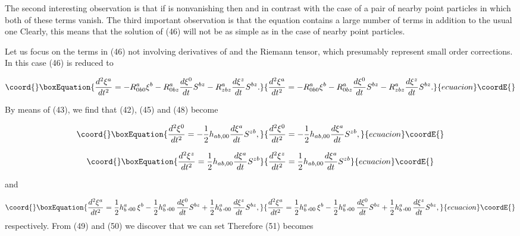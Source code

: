 \documentclass[a4paper,12pt]{article}
\begin{document}
The second interesting observation is that if \coordHE{} is nonvanishing then \coordHE{} and \coordHE{}
in contrast with the case of a pair of nearby point particles in which both
of these terms vanish. The third important observation is that the \coordHE{} equation contains a large number of terms in
addition to the usual one \coordHE{} Clearly, this means that
the solution of (46) will not be as simple as in the case of nearby point
particles.

Let us focus on the terms in (46) not involving derivatives of \coordHE{} and
the Riemann tensor, which presumably represent small order corrections. In
this case (46) is reduced to

\begin{equation}\coord{}\boxEquation{
\frac{d^{2}\xi ^{a}}{dt^{2}}=-R_{0b0}^{a}\xi ^{b}-R_{0bz}^{a}\frac{d\xi ^{0}
}{dt}S^{bz}-R_{zbz}^{a}\frac{d\xi ^{z}}{dt}S^{bz}.  \label{48}
}{
\frac{d^{2}\xi ^{a}}{dt^{2}}=-R_{0b0}^{a}\xi ^{b}-R_{0bz}^{a}\frac{d\xi ^{0}
}{dt}S^{bz}-R_{zbz}^{a}\frac{d\xi ^{z}}{dt}S^{bz}.  }{ecuacion}\coordE{}\end{equation}

By means of (43), we find that (42), (45) and (48) become

\begin{equation}\coord{}\boxEquation{
\frac{d^{2}\xi^{0}}{dt^{2}}=-\frac{1}{2}h_{ab,00}\frac{d\xi^{a}}{dt}S^{zb},
\label{49}
}{
\frac{d^{2}\xi^{0}}{dt^{2}}=-\frac{1}{2}h_{ab,00}\frac{d\xi^{a}}{dt}S^{zb},
}{ecuacion}\coordE{}\end{equation}

\begin{equation}\coord{}\boxEquation{
\frac{d^{2}\xi ^{z}}{dt^{2}}=\frac{1}{2}h_{ab,00}\frac{d\xi ^{a}}{dt}S^{zb}
\label{50}
}{
\frac{d^{2}\xi ^{z}}{dt^{2}}=\frac{1}{2}h_{ab,00}\frac{d\xi ^{a}}{dt}S^{zb}
}{ecuacion}\coordE{}\end{equation}

and

\begin{equation}\coord{}\boxEquation{
\frac{d^{2}\xi ^{a}}{dt^{2}}=\frac{1}{2}h_{b}^{a},_{00}\xi ^{b}-\frac{1}{2}
h_{b}^{a},_{00}\frac{d\xi ^{0}}{dt}S^{bz}+\frac{1}{2}h_{b}^{a},_{00}\frac{
d\xi ^{z}}{dt}S^{bz},  \label{51}
}{
\frac{d^{2}\xi ^{a}}{dt^{2}}=\frac{1}{2}h_{b}^{a},_{00}\xi ^{b}-\frac{1}{2}
h_{b}^{a},_{00}\frac{d\xi ^{0}}{dt}S^{bz}+\frac{1}{2}h_{b}^{a},_{00}\frac{
d\xi ^{z}}{dt}S^{bz},  }{ecuacion}\coordE{}\end{equation}
respectively. From (49) and (50) we discover that we can set \coordHE{} Therefore (51) becomes
\end{document}
